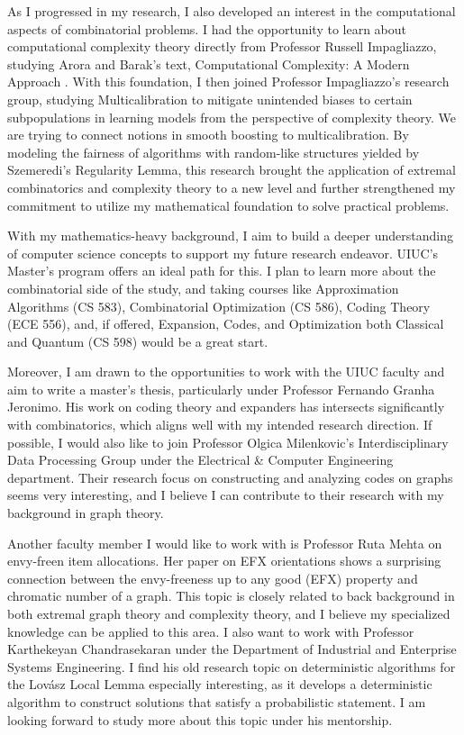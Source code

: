 \documentclass[12pt]{article}
\begin{document}
As I progressed in my research, I also developed an interest in the computational aspects of
combinatorial problems. I had the opportunity to learn about computational complexity theory
directly from Professor Russell Impagliazzo, studying Arora and Barak's text, Computational
Complexity: A Modern Approach \cite{arora2009computational}. With this foundation, I then joined
Professor Impagliazzo's research group, studying Multicalibration to mitigate unintended biases to
certain subpopulations in learning models from the perspective of complexity theory. We are trying
to connect notions in smooth boosting to multicalibration. By modeling the fairness of algorithms
with random-like structures yielded by Szemeredi's Regularity Lemma, this research brought the
application of extremal combinatorics and complexity theory to a new level and further strengthened
my commitment to utilize my mathematical foundation to solve practical problems.

With my mathematics-heavy background, I aim to build a deeper understanding of computer science
concepts to support my future research endeavor. UIUC's Master's program offers an ideal path for
this. I plan to learn more about the combinatorial side of the study, and taking courses like
Approximation Algorithms (CS 583), Combinatorial Optimization (CS 586), Coding Theory (ECE 556),
and, if offered, Expansion, Codes, and Optimization both Classical and Quantum (CS 598) would be a
great start.

Moreover, I am drawn to the opportunities to work with the UIUC faculty and aim to write a master's
thesis, particularly under Professor Fernando Granha Jeronimo. His work on coding theory and
expanders has intersects significantly with combinatorics, which aligns well with my intended
research direction. If possible, I would also like to join Professor Olgica Milenkovic's
Interdisciplinary Data Processing Group under the Electrical \& Computer Engineering department.
Their research focus on constructing and analyzing codes on graphs seems very interesting, and I
believe I can contribute to their research with my background in graph theory.

Another faculty member I would like to work with is Professor Ruta Mehta on envy-freen item
allocations. Her paper on EFX orientations shows a surprising connection between the envy-freeness
up to any good (EFX) property and chromatic number of a
graph\cite{zeng2024structureefxorientationsgraphs}. This topic is closely related to back background
in both extremal graph theory and complexity theory, and I believe my specialized knowledge can be
applied to this area. I also want to work with Professor Karthekeyan Chandrasekaran under the
Department of Industrial and Enterprise Systems Engineering. I find his old research topic on
deterministic algorithms for the Lovász Local
Lemma\cite{chandrasekaran2019deterministicalgorithmslovaszlocal} especially interesting, as it
develops a deterministic algorithm to construct solutions that satisfy a probabilistic statement. I
am looking forward to study more about this topic under his mentorship. 
\end{document}
